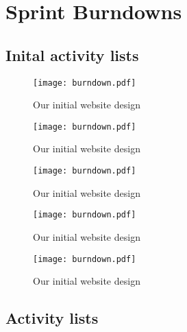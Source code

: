 \chapter{Sprint Burndowns}\label{appendix:burndown}

\section{Inital activity lists}

\begin{figure}[h!]
    \centering
	\texttt{[image: burndown.pdf]}
	\caption{Our initial website design}
	\label{fig:old_website_design}
\end{figure}

\begin{figure}[h!]
    \centering
	\texttt{[image: burndown.pdf]}
	\caption{Our initial website design}
	\label{fig:old_website_design}
\end{figure}

\begin{figure}[h!]
    \centering
	\texttt{[image: burndown.pdf]}
	\caption{Our initial website design}
	\label{fig:old_website_design}
\end{figure}

\begin{figure}[h!]
    \centering
	\texttt{[image: burndown.pdf]}
	\caption{Our initial website design}
	\label{fig:old_website_design}
\end{figure}


\begin{figure}[h!]
    \centering
	\texttt{[image: burndown.pdf]}
	\caption{Our initial website design}
	\label{fig:old_website_design}
\end{figure}


% 
% 
% 
\section{Activity lists}

